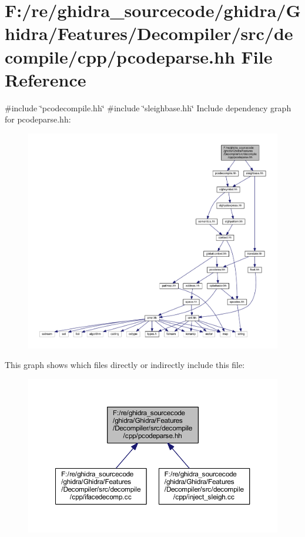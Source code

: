 \hypertarget{pcodeparse_8hh}{}\section{F\+:/re/ghidra\+\_\+sourcecode/ghidra/\+Ghidra/\+Features/\+Decompiler/src/decompile/cpp/pcodeparse.hh File Reference}
\label{pcodeparse_8hh}
{\ttfamily \#include \char`\"{}pcodecompile.\+hh\char`\"{}}\newline
{\ttfamily \#include \char`\"{}sleighbase.\+hh\char`\"{}}\newline
Include dependency graph for pcodeparse.\+hh\+:
\nopagebreak
\begin{figure}[H]
\begin{center}
\leavevmode
\includegraphics[width=350pt]{pcodeparse_8hh__incl}
\end{center}
\end{figure}
This graph shows which files directly or indirectly include this file\+:
\nopagebreak
\begin{figure}[H]
\begin{center}
\leavevmode
\includegraphics[width=350pt]{pcodeparse_8hh__dep__incl}
\end{center}
\end{figure}
